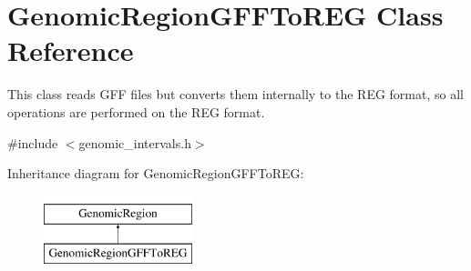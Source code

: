 \hypertarget{classGenomicRegionGFFToREG}{
\section{GenomicRegionGFFToREG Class Reference}
\label{classGenomicRegionGFFToREG}
}


This class reads GFF files but converts them internally to the REG format, so all operations are performed on the REG format.  




{\ttfamily \#include $<$genomic\_\-intervals.h$>$}

Inheritance diagram for GenomicRegionGFFToREG:\begin{figure}[H]
\begin{center}
\leavevmode
\includegraphics[height=2.000000cm]{classGenomicRegionGFFToREG}
\end{center}
\end{figure}
